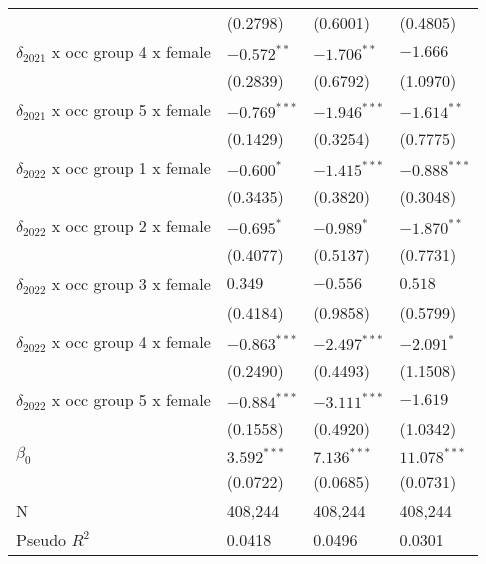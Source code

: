 \begin{tabular}{llll}
                                       &           (0.2798) &           (0.6001) &           (0.4805) \\
$\delta_{2021}$ x occ group 4 x female &      $-0.572^{**}$ &      $-1.706^{**}$ &           $-1.666$ \\
                                       &           (0.2839) &           (0.6792) &           (1.0970) \\
$\delta_{2021}$ x occ group 5 x female &     $-0.769^{***}$ &     $-1.946^{***}$ &      $-1.614^{**}$ \\
                                       &           (0.1429) &           (0.3254) &           (0.7775) \\
$\delta_{2022}$ x occ group 1 x female &         $-0.600^*$ &     $-1.415^{***}$ &     $-0.888^{***}$ \\
                                       &           (0.3435) &           (0.3820) &           (0.3048) \\
$\delta_{2022}$ x occ group 2 x female &         $-0.695^*$ &         $-0.989^*$ &      $-1.870^{**}$ \\
                                       &           (0.4077) &           (0.5137) &           (0.7731) \\
$\delta_{2022}$ x occ group 3 x female &            $0.349$ &           $-0.556$ &            $0.518$ \\
                                       &           (0.4184) &           (0.9858) &           (0.5799) \\
$\delta_{2022}$ x occ group 4 x female &     $-0.863^{***}$ &     $-2.497^{***}$ &         $-2.091^*$ \\
                                       &           (0.2490) &           (0.4493) &           (1.1508) \\
$\delta_{2022}$ x occ group 5 x female &     $-0.884^{***}$ &     $-3.111^{***}$ &           $-1.619$ \\
                                       &           (0.1558) &           (0.4920) &           (1.0342) \\
$\beta_0$                              &      $3.592^{***}$ &      $7.136^{***}$ &     $11.078^{***}$ \\
                                       &           (0.0722) &           (0.0685) &           (0.0731) \\
N                                      &            408,244 &            408,244 &            408,244 \\
Pseudo $R^2$                           &             0.0418 &             0.0496 &             0.0301 \\
\bottomrule
\end{tabular}
